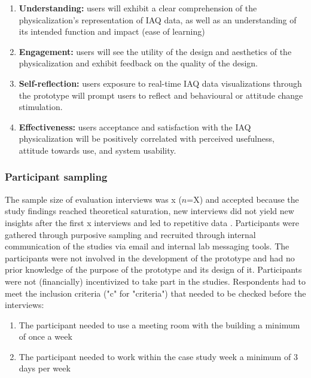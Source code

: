 \begin{enumerate}
    \renewcommand{\labelenumi}{H\arabic{enumi}:}
    \item \textbf{Understanding:} users will exhibit a clear comprehension of the physicalization's representation of IAQ data, as well as an understanding of its intended function and impact (ease of learning)
    \item \textbf{Engagement:} users will see the utility of the design and aesthetics of the physicalization and exhibit feedback on the quality of the design.
    \item \textbf{Self-reflection:} users exposure to real-time IAQ data visualizations through the prototype will prompt users to reflect and behavioural or attitude change stimulation.
    \item \textbf{Effectiveness:} users acceptance and satisfaction with the IAQ physicalization will be positively correlated with perceived usefulness, attitude towards use, and system usability.
\end{enumerate}

\subsubsection{Participant sampling}

The sample size of evaluation interviews was x ($n$=X) and accepted because the study findings reached theoretical saturation, new interviews did not yield new insights after the first x interviews and led to repetitive data \cite{steph_menken_introduction_2016}. Participants were gathered through purposive sampling and recruited through internal communication of the studies via email and internal lab messaging tools. The participants were not involved in the development of the prototype and had no prior knowledge of the purpose of the prototype and its design of it. Participants were not (financially) incentivized to take part in the studies. Respondents had to meet the inclusion criteria ("c" for "criteria") that needed to be checked before the interviews: 

\begin{enumerate}
    \renewcommand{\labelenumi}{C\arabic{enumi}:}
    \item The participant needed to use a meeting room with the building a minimum of once a week
    \item The participant needed to work within the case study week a minimum of 3 days per week
\end{enumerate}


